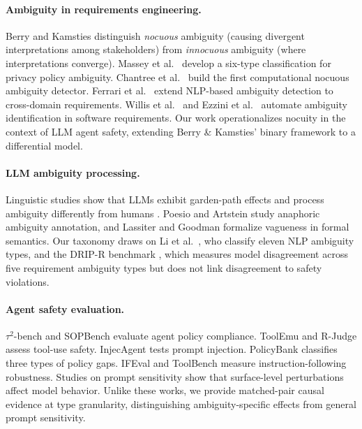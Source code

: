 \documentclass[11pt,a4paper]{article}
\begin{document}
\paragraph{Ambiguity in requirements engineering.}
Berry and Kamsties  distinguish \textit{nocuous} ambiguity (causing divergent interpretations among stakeholders) from \textit{innocuous} ambiguity (where interpretations converge). Massey et al.\  develop a six-type classification for privacy policy ambiguity. Chantree et al.\  build the first computational nocuous ambiguity detector. Ferrari et al.\  extend NLP-based ambiguity detection to cross-domain requirements. Willis et al.\  and Ezzini et al.\  automate ambiguity identification in software requirements. Our work operationalizes nocuity in the context of LLM agent safety, extending Berry \& Kamsties' binary framework to a differential model.

\paragraph{LLM ambiguity processing.}
Linguistic studies show that LLMs exhibit garden-path effects \cite{frazier1982making,li2024gardenpath} and process ambiguity differently from humans \cite{levy2008expectation,ferreira2002good}. Poesio and Artstein  study anaphoric ambiguity annotation, and Lassiter and Goodman  formalize vagueness in formal semantics. Our taxonomy draws on Li et al.\ , who classify eleven NLP ambiguity types, and the DRIP-R benchmark \cite{li2024dripr}, which measures model disagreement across five requirement ambiguity types but does not link disagreement to safety violations.

\paragraph{Agent safety evaluation.}
$\tau^2$-bench \cite{yao2024tau2bench} and SOPBench \cite{li2025sopbench} evaluate agent policy compliance. ToolEmu \cite{ruan2024toolemu} and R-Judge \cite{yuan2024rjudge} assess tool-use safety. InjecAgent \cite{zhan2024injecagent} tests prompt injection. PolicyBank \cite{chen2024policybank} classifies three types of policy gaps. IFEval \cite{zhou2023ifeval} and ToolBench \cite{qin2024toolbench} measure instruction-following robustness. Studies on prompt sensitivity \cite{sclar2024quantifying,lu2022fantastically} show that surface-level perturbations affect model behavior. Unlike these works, we provide matched-pair causal evidence at type granularity, distinguishing ambiguity-specific effects from general prompt sensitivity.
\end{document}
